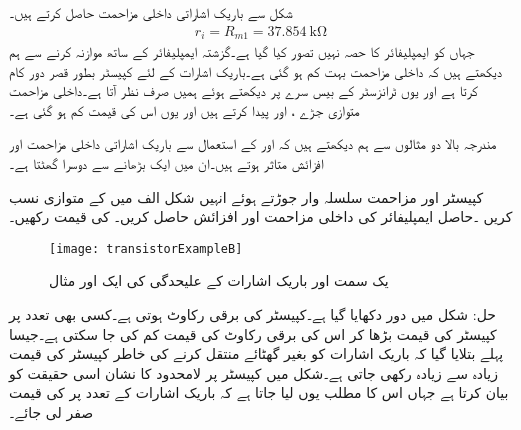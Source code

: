 شکل سے باریک اشاراتی داخلی مزاحمت حاصل کرتے ہیں۔
\begin{align*}
r_i=R_{m1}=\SI{37.854}{\kilo \ohm}
\end{align*}
جہاں  کو ایمپلیفائر کا حصہ نہیں تصور کیا گیا ہے۔گزشتہ ایمپلیفائر کے ساتھ موازنہ کرنے سے ہم دیکھتے ہیں کہ داخلی مزاحمت بہت کم ہو گئی ہے۔باریک اشارات کے لئے کپیسٹر  بطور قصر دور کام کرتا ہے اور یوں ٹرانزسٹر کے بیس سرے پر دیکھتے ہوئے ہمیں صرف  نظر آتا ہے۔داخلی مزاحمت متوازی جڑے ، اور  پیدا کرتے ہیں اور یوں اس کی قیمت کم ہو گئی ہے۔

مندرجہ بالا دو مثالوں سے ہم دیکھتے ہیں کہ  اور  کے استعمال سے باریک اشاراتی داخلی مزاحمت   اور افزائش   متاثر ہوتے ہیں۔ان میں ایک بڑھانے سے دوسرا گھٹتا ہے۔ 



کپیسٹر   اور مزاحمت   سلسلہ وار جوڑتے ہوئے انہیں شکل  الف میں   کے متوازی نسب کریں ۔حاصل ایمپلیفائر کی داخلی مزاحمت  اور افزائش   حاصل کریں۔  کی قیمت   رکھیں۔
\begin{figure}
\centering
\texttt{[image: transistorExampleB]}
\caption{یک سمت اور باریک اشارات کے علیحدگی کی ایک اور مثال}
\label{شکل_مثال_کا_دور_ب}
\end{figure}
حل: شکل   میں دور دکھایا گیا ہے۔کپیسٹر کی برقی رکاوٹ  ہوتی ہے۔کسی بھی تعدد پر کپیسٹر کی قیمت بڑھا کر اس کی برقی رکاوٹ کی قیمت کم کی جا سکتی ہے۔جیسا پہلے بتلایا گیا کہ باریک اشارات کو بغیر گھٹائے منتقل کرنے کی خاطر کپیسٹر کی قیمت زیادہ سے زیادہ رکھی جاتی ہے۔شکل میں کپیسٹر پر لامحدود کا نشان  اسی حقیقت کو بیان کرتا ہے جہاں اس کا مطلب یوں لیا جاتا ہے کہ باریک اشارات کے تعدد پر  کی قیمت صفر لی جائے۔

